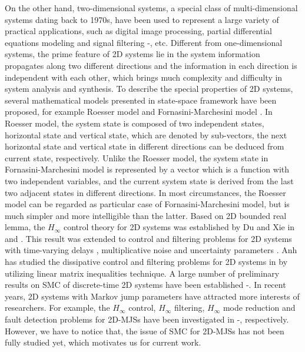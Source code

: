 \documentclass[conference]{IEEEtran}
\begin{document}
	
	
	On the other hand, two-dimensional systems, a special class of multi-dimensional systems  dating back to 1970s,  have been used to represent a large variety of practical applications, such as digital image processing, partial differential equations modeling and signal filtering \cite{roesser}-\cite{signal-processing}, etc. Different from one-dimensional systems, the prime feature of  2D systems lie in the system information propagates along two different directions and the information in each direction is independent with each other, which brings much complexity and difficulty in system analysis and synthesis. To describe the special properties of 2D systems, several  mathematical models presented in state-space framework have been proposed, for example Roesser model \cite{roesser} and Fornasini-Marchesini model \cite{FM-model}. In Roesser model, the system state is composed of two independent states, horizontal state and vertical state, which are denoted by  sub-vectors, the next horizontal state and vertical state in different directions can be deduced from current state, respectively. Unlike the Roesser model, the system state in Fornasini-Marchesini model is represented by a vector which is a function with two independent variables, and the current system state is derived from the  last two adjacent states in different directions. In most circumstances, the Roesser model can be regarded as particular case of Fornasini-Marchesini model, but is much simpler and more intelligible than the latter. Based on 2D bounded real lemma, the $H_{\infty}$ control theory for 2D systems was established by Du and Xie in \cite{du-chunling&l-xie} and \cite{Du-Xie}. This result was extended to control and filtering problems for 2D systems with time-varying delays \cite{tile-varing-delay},  multiplicative noise \cite{Ahn-noise} and uncertainty parameters \cite{Uncertainty-parmeters2D}. 
	Anh has studied  the dissipative control and filtering problems for 2D systems in \cite{Ahn-2}  by utilizing linear matrix inequalities technique.
	A large number of preliminary results on SMC of discrete-time 2D systems have been established \cite{SMC2D1}-\cite{SMC2D3}.
	In recent years, 2D systems with Markov jump parameters have attracted more interests of researchers. For example,  the $H_{\infty}$ control, $H_{\infty}$ filtering, $H_{\infty}$ mode reduction and fault detection problems for 2D-MJSs have been investigated in \cite{Markov-Gao}-\cite{fault-dectction-shenying}, respectively. However, we have to notice that, the issue of SMC  for 2D-MJSs has not been fully studied yet, which motivates us for current work.
	 
\end{document}
